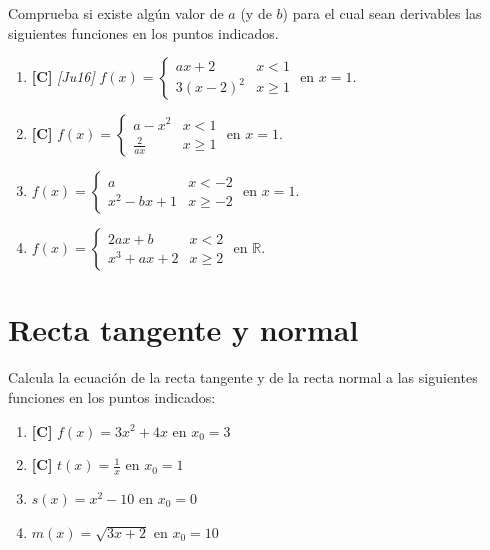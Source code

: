 \Exercicio Comprueba si existe algún valor de $a$ (y de $b$) para el cual sean derivables las siguientes funciones en los puntos indicados.
\begin{enumerate}[topsep=0pt]
	\item \textbf{[C]} \textit{[Ju16]} $ f(x) = \left\{ \begin{array}{lc}
						 ax+2 & x < 1 \\
						 3(x-2)^2  & x \ge 1
						 \end{array}
	 					\right.$
	 					en $x=1$.
	\item \textbf{[C]} $ f(x) = \left\{ \begin{array}{lc}
						 a-x^2 & x < 1 \\
						 \frac{2}{ax}  & x \ge 1
						 \end{array}
	 					\right.$
	 					en $x=1$.
	 \item $ f(x) = \left\{ \begin{array}{lc}
		 	a & x < -2 \\
		 	x^2-bx+1  & x \ge -2
			\end{array}
			\right.$
		 	en $x=1$.
	 \item $ f(x) = \left\{ \begin{array}{lc}
			2ax +b & x < 2 \\
			x^3+ax+2  & x \ge 2
			\end{array}
			\right.$
			en $\mathbb{R}$.

\end{enumerate}

\section{Recta tangente y normal}

\Exercicio Calcula la ecuación de la recta tangente y de la recta normal a las siguientes funciones en los puntos indicados:
\begin{enumerate}[topsep=0pt]
	\item \textbf{[C]} $ f(x) = 3x^2 + 4x $ en  $x_0 = 3$
	\item \textbf{[C]} $ t(x) = \frac{1}{x} $ en $x_0 = 1$
	\item $s(x) = x^2 -10$ en $x_0 = 0$
	\item $m(x) = \sqrt{3x + 2}$ en $x_0 = 10$
\end{enumerate}

